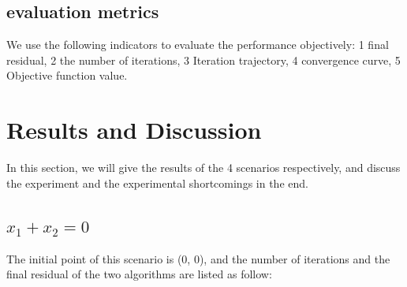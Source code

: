 \documentclass[12pt]{article}
\begin{document}
\subsection{evaluation metrics}
We use the following indicators to  evaluate the performance objectively: 1 final residual, 2 the number of iterations, 3 Iteration trajectory, 4 convergence curve, 5 Objective function value.
\section{Results and Discussion}
In this section, we will give the results of the 4 scenarios respectively, and discuss the experiment and the experimental shortcomings in the end.
\subsection{$x_1 + x_2 = 0 $}
The initial point of this scenario is (0, 0), and the number of iterations and the final residual of the two algorithms are listed as follow:
\begin{table}[h]
    \centering
    \caption{s1}
    \label{tab:s1}
\end{table}
\end{document}
